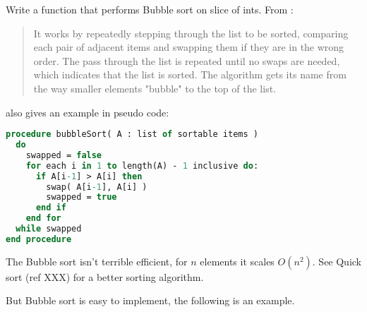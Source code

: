 \begin{Exercise}[title={Bubble sort},difficulty=5]
\label{ex:bubble}
\Question\label{ex:bubble q1} Write a function that performs 
Bubble sort on slice of ints. From \cite{bubblesort}:
\begin{quote}
It works by repeatedly stepping through the list to be sorted, comparing each
pair of adjacent items and swapping them if they are in the wrong order. The
pass through the list is repeated until no swaps are needed, which indicates
that the list is sorted. The algorithm gets its name from the way smaller
elements "bubble" to the top of the list. 
\end{quote}

\cite{bubblesort} also gives an example in pseudo code:
\begin{lstlisting}[language=pascal]
procedure bubbleSort( A : list of sortable items )
  do
    swapped = false
    for each i in 1 to length(A) - 1 inclusive do:
      if A[i-1] > A[i] then
        swap( A[i-1], A[i] )
        swapped = true
      end if
    end for
  while swapped
end procedure
\end{lstlisting}
\end{Exercise}

\begin{Answer}
\Question 
The Bubble sort isn't terrible efficient, for $n$ elements it scales
$O(n^2)$. See Quick sort (ref XXX) for a better sorting algorithm.

But Bubble sort is easy to implement, the following is an example.


\end{Answer}
